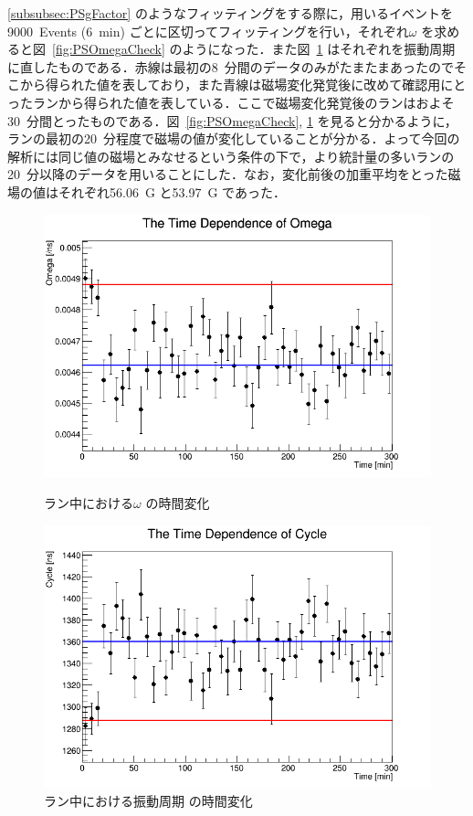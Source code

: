 \ref{subsubsec:PSgFactor} のようなフィッティングをする際に，用いるイベントを9000~Events (6~min) ごとに区切ってフィッティングを行い，それぞれ$\omega$ を求めると図~\ref{fig:PSOmegaCheck} のようになった．また図~\ref{fig:PSCycleCheck} はそれぞれを振動周期に直したものである．赤線は最初の8~分間のデータのみがたまたまあったのでそこから得られた値を表しており，また青線は磁場変化発覚後に改めて確認用にとったランから得られた値を表している．ここで磁場変化発覚後のランはおよそ30~分間とったものである．図~\ref{fig:PSOmegaCheck}, \ref{fig:PSCycleCheck} を見ると分かるように，ランの最初の20~分程度で磁場の値が変化していることが分かる．よって今回の解析には同じ値の磁場とみなせるという条件の下で，より統計量の多いランの20~分以降のデータを用いることにした．なお，変化前後の加重平均をとった磁場の値はそれぞれ56.06~G と53.97~G であった．

\begin{figure}[h]
	\centering
	\begin{minipage}{0.45\textwidth}
	\centering
	\includegraphics[width = \textwidth]{figure/odagawa/PSOmegaCheck.png}
	\caption{ラン中における$\omega$ の時間変化}
	\label{fig:PSOmegaCheck}
	\end{minipage}
	\begin{minipage}{0.45\textwidth}
	\centering
	\includegraphics[width = \textwidth]{figure/odagawa/PSCycleCheck.png}
	\caption{ラン中における振動周期 の時間変化}
	\label{fig:PSCycleCheck}
	\end{minipage}
\end{figure}


